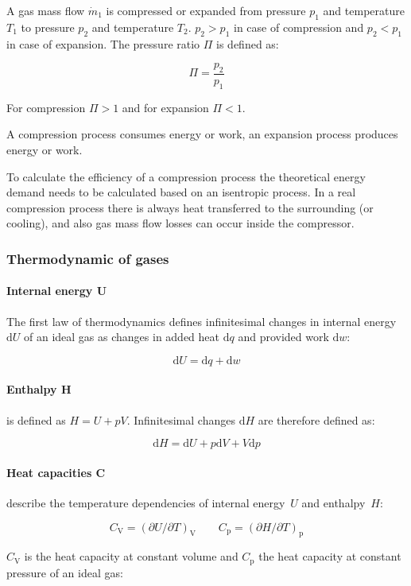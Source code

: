 \documentclass[11pt,a4paper,english,twoside]{scrreprt}
\begin{document}
A gas mass flow $\dot{m}_1$ is compressed or expanded from pressure $p_1$ and temperature $T_1$ to pressure $p_2$ and temperature $T_2$. $p_2 >p_1$ in case of compression and $p_2 < p_1$ in case of expansion. The pressure ratio $\Pi$ is defined as:

\[\Pi =\frac{p_{2} }{p_{1}}\]

For compression $\Pi>1$ and for expansion $\Pi<1$.

A compression process consumes energy or work, an expansion process produces energy or work.

To calculate the efficiency of a compression process the theoretical energy demand needs to be calculated based on an isentropic process. In a real compression process there is always heat transferred to the surrounding (or cooling), and also gas mass flow losses can occur inside the compressor.



\subsubsection{Thermodynamic of gases}

\paragraph{Internal energy U} The first law of thermodynamics \cite{Atkins} defines infinitesimal changes in internal energy $\mathrm{d}U$ of an ideal gas as changes in added heat $\mathrm{d}q$ and provided work $\mathrm{d}w$:

\[\mathrm{d}U = \mathrm{d}q + \mathrm{d}w\]


\paragraph{Enthalpy H} is defined as $H=U+pV$. Infinitesimal changes $\mathrm{d}H$ are therefore defined as:

\[\mathrm{d}H = \mathrm{d}U + p\mathrm{d}V + V\mathrm{d}p\]

\paragraph{Heat capacities C} describe the temperature dependencies of internal energy~$U$ and enthalpy~$H$:

\[C_\text{V} =(\partial U/\partial T)_\text{V} \qquad C_\text{p} =(\partial H/\partial T)_\text{p} \]

$C_\text{V}$ is the heat capacity at constant volume and $C_\text{p}$ the heat capacity at constant pressure of an ideal gas:
\end{document}
